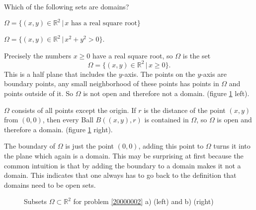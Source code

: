 Which of the following sets are domains?
\begin{teilaufgaben}
\item $\Omega=\{(x,y)\in\mathbb R^2\,|\, \text{$x$ has a real square root}\}$
\item $\Omega=\{(x,y)\in\mathbb R^2\,|\, x^2+y^2>0\}$.
\end{teilaufgaben}


\begin{loesung}
\begin{teilaufgaben}
\item
Precisely the numbers
$x\ge 0$ have a real square root, so $\Omega$ is the set
\[
\Omega=\{(x,y)\in\mathbb R^2\,|\, x\ge 0\}.
\]
This is a half plane that includes the $y$-axis.
The points on the $y$-axis are boundary points, any small neighborhood of
these points has points in $\Omega$ and points outside of it.
So $\Omega$ is not open and therefore not a domain.
(figure \ref{20000002:fig} left).
\item
$\Omega$ consists of all points except the origin.
If $r$ is the distance of the point $(x,y)$ from $(0,0)$, then every
Ball
$B((x,y),r)$ is contained in $\Omega$, so $\Omega$ is open and therefore
a domain.
(figure \ref{20000002:fig} right).

The boundary of $\Omega$ is just the point $(0,0)$, adding this point
to $\Omega$ turns it into the plane which again is a domain.
This may be surprising at first because the common intuition is that
by adding the boundary to a domain makes it not a domain.
This indicates that one always has to go back to the definition
that domains need to be open sets.
\qedhere
\end{teilaufgaben}
\begin{figure}
\begin{center}
\qquad
{}
\end{center}
\caption{Subsets $\Omega\subset\mathbb R^2$ for problem \ref{20000002} a)
(left)
and b) (right)\label{20000002:fig}}
\end{figure}
\end{loesung}
